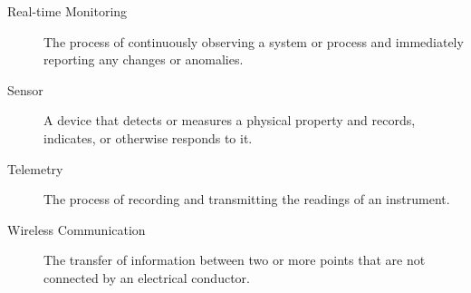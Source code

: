{\begin{description}
	\item[Real-time Monitoring] 
	The process of continuously observing a system or process and immediately reporting any changes or anomalies.
	
	\item[Sensor] 
	A device that detects or measures a physical property and records, indicates, or otherwise responds to it.
	
	\item[Telemetry] 
	The process of recording and transmitting the readings of an instrument.
	
	\item[Wireless Communication] 
	The transfer of information between two or more points that are not connected by an electrical conductor.

\end{description}

}
